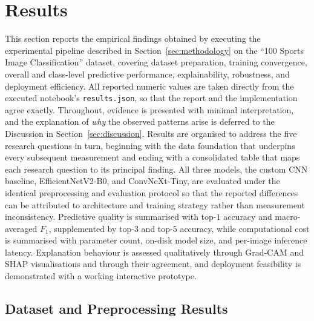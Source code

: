 \section{Results}
\label{sec:results}

This section reports the empirical findings obtained by executing the experimental pipeline described in Section~\ref{sec:methodology} on the ``100 Sports Image Classification'' dataset, covering dataset preparation, training convergence, overall and class-level predictive performance, explainability, robustness, and deployment efficiency.
All reported numeric values are taken directly from the executed notebook's \texttt{results.json}, so that the report and the implementation agree exactly.
Throughout, evidence is presented with minimal interpretation, and the explanation of \emph{why} the observed patterns arise is deferred to the Discussion in Section~\ref{sec:discussion}.
Results are organised to address the five research questions in turn, beginning with the data foundation that underpins every subsequent measurement and ending with a consolidated table that maps each research question to its principal finding.
All three models, the custom CNN baseline, EfficientNetV2-B0, and ConvNeXt-Tiny, are evaluated under the identical preprocessing and evaluation protocol so that the reported differences can be attributed to architecture and training strategy rather than measurement inconsistency.
Predictive quality is summarised with top-$1$ accuracy and macro-averaged $F_1$, supplemented by top-$3$ and top-$5$ accuracy, while computational cost is summarised with parameter count, on-disk model size, and per-image inference latency.
Explanation behaviour is assessed qualitatively through Grad-CAM and SHAP visualisations and through their agreement, and deployment feasibility is demonstrated with a working interactive prototype.

\subsection{Dataset and Preprocessing Results}
\label{subsec:res-dataset}

